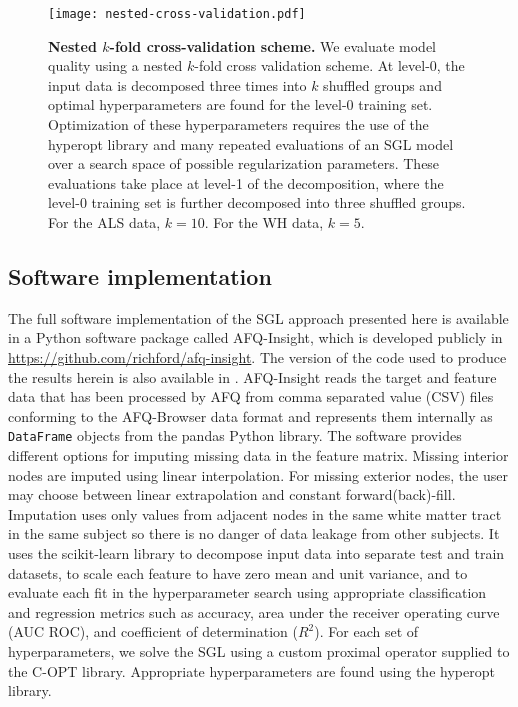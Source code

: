 \begin{figure}[!h]
    \centering
    \texttt{[image: nested-cross-validation.pdf]}
    \caption{{\bf Nested $k$-fold cross-validation scheme.}
        We evaluate model quality using a nested $k$-fold cross
        validation scheme. At level-0, the input data is decomposed
        three times into $k$ shuffled groups and optimal hyperparameters
        are found for the level-0 training set. Optimization of these
        hyperparameters requires the use of the hyperopt library and
        many repeated evaluations of an SGL model over a search space
        of possible regularization parameters. These evaluations take
        place at level-1 of the decomposition, where the level-0 training
        set is further decomposed into three shuffled groups.
        For the ALS data, $k=10$. For the WH data, $k=5$.
    }
    \label{fig:cross-val}
\end{figure}

\subsection*{Software implementation}

The full software implementation of the SGL approach presented here is available
in a Python software package called AFQ-Insight, which is developed publicly in
\url{https://github.com/richford/afq-insight}. The version of the code used to
produce the results herein is also available in .
AFQ-Insight reads the target and feature data that has been processed by AFQ
from comma separated value (CSV) files conforming to the AFQ-Browser data
format\cite{yeatman2018browser} and represents them internally as
\lstinline{DataFrame} objects from the pandas Python
library\cite{mckinney2010data}. The software provides different options for
imputing missing data in the feature matrix. Missing interior nodes are imputed
using linear interpolation. For missing exterior nodes, the user may choose
between linear extrapolation and constant forward(back)-fill. Imputation uses
only values from adjacent nodes in the same white matter tract in the same
subject so there is no danger of data leakage from other subjects. It uses the
scikit-learn\cite{scikit-learn} library to decompose input data into separate
test and train datasets, to scale each feature to have zero mean and
unit variance, and to evaluate each fit in the hyperparameter search using
appropriate classification and regression metrics such as accuracy, area
under the receiver operating curve (AUC ROC), and coefficient of determination
($R^2$). For each set of hyperparameters, we solve the SGL using a custom
proximal operator supplied to the C-OPT library\cite{copt}. Appropriate
hyperparameters are found using the hyperopt library\cite{Bergstra_2015}.
